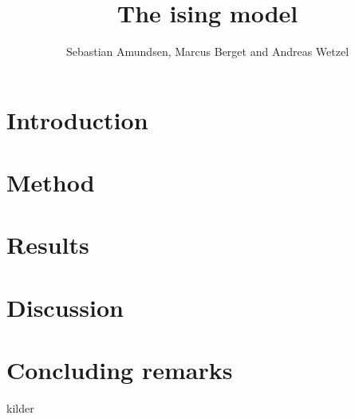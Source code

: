\documentclass{article}
\begin{document}
\title{The ising model}
\author{Sebastian Amundsen, Marcus Berget and Andreas Wetzel}

\maketitle

\begin{abstract}

\end{abstract}

\begin{multicols}{2}

\section{Introduction}

\section{Method}

\section{Results}

\section{Discussion}

\section{Concluding remarks}



\end{multicols}



\begin{thebibliography}{9}
	kilder
\end{thebibliography}
\end{document}
